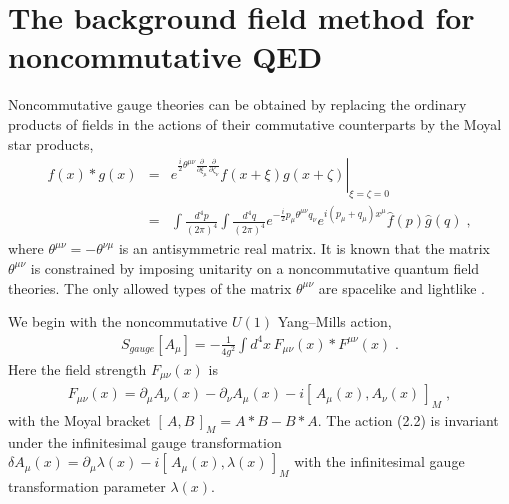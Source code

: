 \documentclass[a4paper,12pt]{article}
\begin{document}
%
%
\section{The background field method for noncommutative QED} 
\setcounter{equation}{0}
\addtocounter{enumi}{1}


Noncommutative gauge theories can be obtained by replacing the ordinary 
products of fields in the actions of their commutative counterparts by the 
Moyal star products, 
%
%
\begin{eqnarray}
f(x) \ast g(x) \!\!&=&\!\! \left.
e^{\frac{i}{2}\theta^{\mu\nu}
\frac{\partial}{\partial \xi_{\mu}}\frac{\partial}{\partial \zeta_{\nu}}}
f(x+\xi)g(x+\zeta) \right|_{\xi=\zeta=0} \nonumber \\
\!\!&=&\!\! \int \frac{d^{4}p}{(2\pi)^{4}}\int \frac{d^{4}q}{(2\pi)^{4}}
e^{-\frac{i}{2}p_{\mu}\theta^{\mu\nu}q_{\nu}}
e^{i(p_{\mu}+q_{\mu})x^{\mu}} \hat{f}(p)\hat{g}(q) \;,
\end{eqnarray}
%
where $\theta^{\mu\nu}=-\theta^{\nu\mu}$ is an antisymmetric real matrix. 
It is known that the matrix $\theta^{\mu\nu}$ is constrained by imposing 
unitarity on a noncommutative quantum field theories. The only allowed types 
of the matrix $\theta^{\mu\nu}$ are spacelike and lightlike 
\cite{JGMKTMMRSS}. 


We begin with the noncommutative $U(1)$ Yang--Mills action, 
%
%
\begin{eqnarray}
S_{gauge}[A_{\mu}] = -\frac{1}{4g^{2}} \int d^{4}x \, 
F_{\mu\nu}(x) \ast F^{\mu\nu}(x) \;.
\end{eqnarray}
%
Here the field strength $F_{\mu\nu}(x)$ is 
%
%
\begin{eqnarray}
F_{\mu\nu}(x) = \partial_{\mu}A_{\nu}(x) - \partial_{\nu}A_{\mu}(x) 
-i[\,A_{\mu}(x), A_{\nu}(x) \,]_{M} \;, 
\end{eqnarray}
%
with the Moyal bracket $[\,A, B \,]_{M} = A \ast B - B \ast A$. 
The action (2.2) is invariant under the infinitesimal gauge transformation 
$\delta A_{\mu}(x)= \partial_{\mu} \lambda(x) 
-i[\, A_{\mu}(x), \lambda(x) \,]_{M}$ with the infinitesimal gauge 
transformation parameter $\lambda(x)$. 
\end{document}

